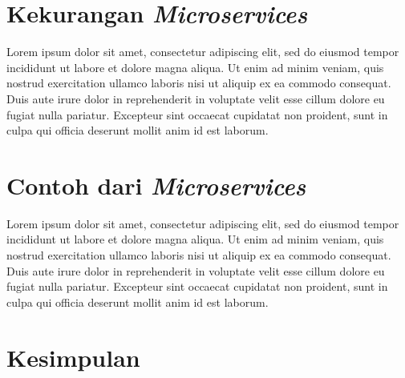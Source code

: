\section{Kekurangan \textit{Microservices}}

Lorem ipsum dolor sit amet, consectetur adipiscing elit, sed do eiusmod tempor incididunt ut labore et dolore magna aliqua. Ut enim ad minim veniam, quis nostrud exercitation ullamco laboris nisi ut aliquip ex ea commodo consequat. Duis aute irure dolor in reprehenderit in voluptate velit esse cillum dolore eu fugiat nulla pariatur. Excepteur sint occaecat cupidatat non proident, sunt in culpa qui officia deserunt mollit anim id est laborum.

\section{Contoh dari \textit{Microservices}}

Lorem ipsum dolor sit amet, consectetur adipiscing elit, sed do eiusmod tempor incididunt ut labore et dolore magna aliqua. Ut enim ad minim veniam, quis nostrud exercitation ullamco laboris nisi ut aliquip ex ea commodo consequat. Duis aute irure dolor in reprehenderit in voluptate velit esse cillum dolore eu fugiat nulla pariatur. Excepteur sint occaecat cupidatat non proident, sunt in culpa qui officia deserunt mollit anim id est laborum.

\section{Kesimpulan}
